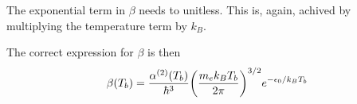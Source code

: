 \documentclass[10pt, a4paper]{article}
\begin{document}
The exponential term in $\beta$ needs to unitless. This is, again, achived by multiplying the temperature term by $k_B$.

The correct expression for $\beta$ is then
\begin{equation*}
    \beta\qty(T_{b}) =\frac{\alpha^{(2)}\qty(T_{b})}{\hbar^3}\qty(\frac{m_{e} k_B T_{b}}{2 \pi})^{3 / 2} e^{-\epsilon_{0} / k_BT_{b}}
\end{equation*}




\end{document}
